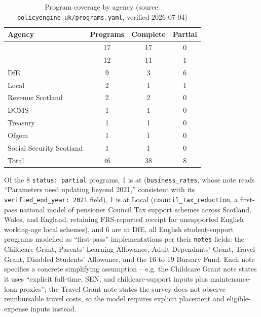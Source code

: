 \begin{table}[H]
    \centering
    \caption{Program coverage by agency (source:
    \texttt{policyengine\_uk/programs.yaml}, verified 2026-07-04)}
    \label{tab:program-coverage}
    \tablefont
    \begin{tabular}{lccc}
        \toprule
        Agency & Programs & Complete & Partial \\
        \midrule
        \dwp{} & 17 & 17 & 0 \\
        \hmrc{} & 12 & 11 & 1 \\
        DfE & 9 & 3 & 6 \\
        Local & 2 & 1 & 1 \\
        Revenue Scotland & 2 & 2 & 0 \\
        DCMS & 1 & 1 & 0 \\
        Treasury & 1 & 1 & 0 \\
        Ofgem & 1 & 1 & 0 \\
        Social Security Scotland & 1 & 1 & 0 \\
        \midrule
        Total & 46 & 38 & 8 \\
        \bottomrule
    \end{tabular}
\end{table}

Of the 8 \texttt{status: partial} programs, 1 is at \hmrc{}
(\texttt{business\_rates}, whose note reads ``Parameters need updating
beyond 2021,'' consistent with its \texttt{verified\_end\_year: 2021}
field), 1 is at Local (\texttt{council\_tax\_reduction}, a first-pass
national model of pensioner Council Tax support schemes across Scotland,
Wales, and England, retaining FRS-reported receipt for unsupported English
working-age local schemes), and 6 are at DfE, all English student-support
programs modelled as ``first-pass'' implementations per their
\texttt{notes} fields: the Childcare Grant, Parents' Learning Allowance,
Adult Dependants' Grant, Travel Grant, Disabled Students' Allowance, and
the 16 to 19 Bursary Fund. Each note specifies a concrete simplifying
assumption -- e.g. the Childcare Grant note states it uses ``explicit
full-time, SEN, and childcare-support inputs plus maintenance-loan
proxies''; the Travel Grant note states the survey does not observe
reimbursable travel costs, so the model requires explicit placement and
eligible-expense inputs instead. 


